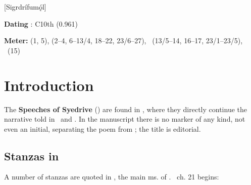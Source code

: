 [Sigrdrífumǫ́l]
\def\thisBookCode{Sigrdrifumal}

\begin{flushright}%
\textbf{Dating} \parencite{Sapp2022}: C10th (0.961)

\textbf{Meter:} \Fornyrdislag (1, 5), \Ljodahattr (2–4, 6–13/4, 18–22, 23/6–27), \Galdralag\ (13/5–14, 16–17, 23/1–23/5), \Malahattr\ (15)%
\end{flushright}

\section{Introduction}

The \textbf{Speeches of Syedrive} (\Sigrdrifumal) are found in \Regius, where they directly continue the narrative told in \Reginsmal\ and \Fafnismal.  In the manuscript there is no marker of any kind, not even an initial, separating the poem from \Fafnismal; the title is editorial.

\subsection{Stanzas in \VolsungaSaga}

A number of stanzas are quoted in \VolsungaMS, the main ms. of \VolsungaSaga.  \VolsungaSaga\ ch. 21 begins:

